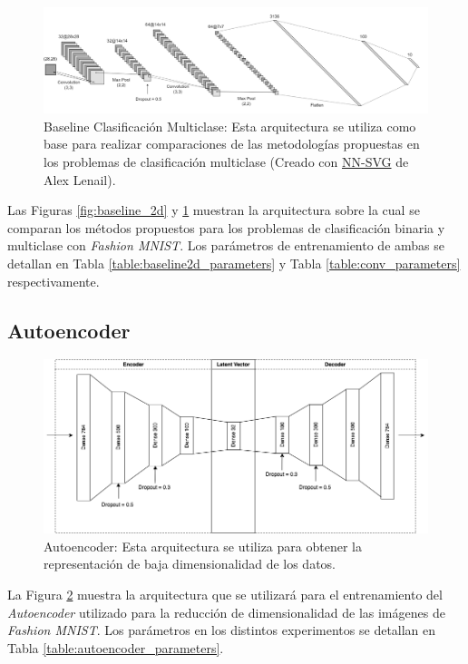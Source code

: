 \begin{figure}[ht]
    \centering
    \includegraphics[width=15cm]{img/tesis/conv.drawio.png}
    \caption{Baseline Clasificación Multiclase: Esta arquitectura se utiliza como base para realizar comparaciones de las metodologías propuestas en los problemas de clasificación multiclase (Creado con \href{http://alexlenail.me/NN-SVG/LeNet.html}{NN-SVG} de Alex Lenail).}
    \label{fig:conv}
\end{figure}

Las Figuras \ref{fig:baseline_2d} y \ref{fig:conv} muestran la arquitectura sobre la cual se comparan los métodos propuestos para los problemas de clasificación binaria y multiclase con \textit{Fashion MNIST}. Los parámetros de entrenamiento de ambas se detallan en Tabla \ref{table:baseline2d_parameters} y Tabla \ref{table:conv_parameters} respectivamente. 

\subsection{Autoencoder}

\begin{figure}[ht]
    \centering
    \includegraphics[width=12cm]{img/tesis/autoencoder_arquitectura.png}
    \caption{Autoencoder: Esta arquitectura se utiliza para obtener la representación de baja dimensionalidad de los datos.}
    \label{fig:autoencoder_arquitectura}
\end{figure}

La Figura \ref{fig:autoencoder_arquitectura} muestra la arquitectura que se utilizará para el entrenamiento del \textit{Autoencoder} utilizado para la reducción de dimensionalidad de las imágenes de \textit{Fashion MNIST}. Los parámetros en los distintos experimentos se detallan en Tabla \ref{table:autoencoder_parameters}.


